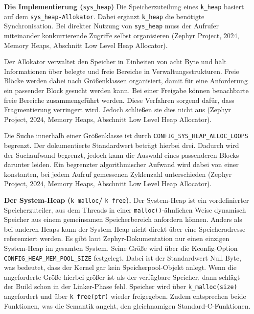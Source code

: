 \textbf{Die Implementierung (}\lstinline[style=fileinline]|sys_heap|\textbf{)} Die Speicherzuteilung eines \lstinline[style=fileinline]|k_heap| basiert auf dem \lstinline[style=fileinline]|sys_heap-Allokator|. Dabei erg{\"a}nzt \lstinline[style=fileinline]|k_heap| die ben{\"o}tigte Synchronisation. Bei direkter Nutzung von \lstinline[style=fileinline]|sys_heap| muss der Aufrufer miteinander konkurrierende Zugriffe selbst organisieren (Zephyr Project, 2024, \glqq{}Memory Heaps\grqq{}, Abschnitt \glqq{}Low Level Heap Allocator\grqq{}).

Der Allokator verwaltet den Speicher in Einheiten von acht Byte und h{\"a}lt Informationen {\"u}ber belegte und freie Bereiche in Verwaltungsstrukturen. Freie Bl{\"o}cke werden dabei nach Gr{\"o}{\ss}enklassen organisiert, damit f{\"u}r eine Anforderung ein passender Block gesucht werden kann. Bei einer Freigabe k{\"o}nnen benachbarte freie Bereiche zusammengef{\"u}hrt werden. Diese Verfahren sorgend daf{\"u}r, dass Fragmentierung verringert wird. Jedoch schlie{\ss}en sie dies nicht aus (Zephyr Project, 2024, \glqq{}Memory Heaps\grqq{}, Abschnitt \glqq{}Low Level Heap Allocator\grqq{}).

Die Suche innerhalb einer Gr{\"o}{\ss}enklasse ist durch \lstinline[style=fileinline]|CONFIG_SYS_HEAP_ALLOC_LOOPS| begrenzt. Der dokumentierte Standardwert betr{\"a}gt hierbei drei. Dadurch wird der Suchaufwand begrenzt, jedoch kann die Auswahl eines passenderen Blocks darunter leiden. Ein begrenzter algorithmischer Aufwand wird dabei von einer konstanten, bei jedem Aufruf gemessenen Zyklenzahl unterschieden (Zephyr Project, 2024, \glqq{}Memory Heaps\grqq{}, Abschnitt \glqq{}Low Level Heap Allocator\grqq{}).

\textbf{Der System-Heap (}\lstinline[style=fileinline]|k_malloc|\textbf{/ }\lstinline[style=fileinline]|k_free|\textbf{).} Der System-Heap ist ein vordefinierter Speicherzuteiler, aus dem Threads in einer \lstinline[style=fileinline]|malloc()|-{\"a}hnlichen Weise dynamisch Speicher aus einem gemeinsamen Speicherbereich anfordern k{\"o}nnen. Anders als bei anderen Heaps kann der System-Heap nicht direkt {\"u}ber eine Speicheradresse referenziert werden. Es gibt laut Zephyr-Dokumentation nur einen einzigen System-Heap im gesamten System. Seine Gr{\"o}{\ss}e wird {\"u}ber die Kconfig-Option \lstinline[style=fileinline]|CONFIG_HEAP_MEM_POOL_SIZE| festgelegt. Dabei ist der Standardwert Null Byte, was bedeutet, dass der Kernel gar kein Speicherpool-Objekt anlegt. Wenn die angeforderte Gr{\"o}{\ss}e hierbei gr{\"o}{\ss}er ist als der verf{\"u}gbare Speicher, dann schl{\"a}gt der Build schon in der Linker-Phase fehl. Speicher wird {\"u}ber \lstinline[style=fileinline]|k_malloc(size)| angefordert und {\"u}ber \lstinline[style=fileinline]|k_free(ptr)| wieder freigegeben. Zudem entsprechen beide Funktionen, was die Semantik angeht, den gleichnamigen Standard-C-Funktionen.

